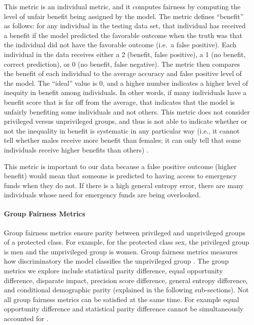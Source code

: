 \documentclass[water,article,submit,moreauthors,pdftex]{mdpi}
\begin{document}
This metric is an individual metric, and it computes fairness by
computing the level of unfair benefit being assigned by the model. The
metric defines ``benefit'' as follows: for any individual in the testing
data set, that individual has received a benefit if the model predicted
the favorable outcome when the truth was that the individual did not
have the favorable outcome (i.e.~a false positive). Each individual in
the data receives either a 2 (benefit, false positive), a 1 (no benefit,
correct prediction), or 0 (no benefit, false negative). The metric then
compares the benefit of each individual to the average accuracy and
false positive level of the model. The ``ideal'' value is 0, and a
higher number indicates a higher level of inequity in benefit among
individuals. In other words, if many individuals have a benefit score
that is far off from the average, that indicates that the model is
unfairly benefiting some individuals and not others. This metric does
not consider privileged versus unprivileged groups, and thus is not able
to indicate whether or not the inequality in benefit is systematic in
any particular way (i.e., it cannot tell whether males receive more
benefit than females; it can only tell that some individuals receive
higher benefits than others)
\citep{caton2020fairness, kypraiou_what_2021}.

This metric is important to our data because a false positive outcome
(higher benefit) would mean that someone is predicted to having access
to emergency funds when they do not. If there is a high general entropy
error, there are many individuals whose need for emergency funds are
being overlooked.

\hypertarget{group-fairness-metrics}{%
\paragraph{Group Fairness Metrics}\label{group-fairness-metrics}}

Group fairness metrics ensure parity between privileged and unprivileged
groups of a protected class. For example, for the protected class sex,
the privileged group is men and the unprivileged group is women. Group
fairness metrics measures how discriminatory the model classifies the
unprivileged group
\citep{binns2020apparent, mehrabi2021survey, caton2020fairness}. The
group metrics we explore include statistical parity difference, equal
opportunity difference, disparate impact, precision score difference,
general entropy difference, and conditional demographic parity
(explained in the following sub-sections). Not all group fairness
metrics can be satisfied at the same time. For example equal opportunity
difference and statistical parity difference cannot be simultaneously
accounted for \citep{kypraiou_what_2021}.
\end{document}
